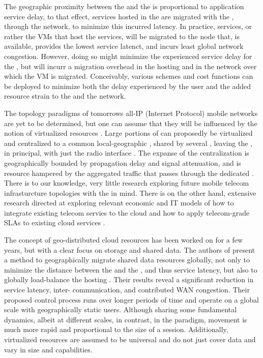 The geographic proximity between the \ue{} and the \dc{} is proportional to application service delay, to that effect, services hosted in the \xcloud{} are migrated with the \ue{}, through the network, to minimize this incurred latency. In practice, services, or rather the VMs that host the services, will be migrated to the node that, is available, provides the lowest service latenct, and incurs least global network congestion. However, doing so might minimize the experienced service delay for the \ue{}, but will incurr a migration overhead in the hosting \dc{} and in the network over which the VM is migrated. Conceivably, various schemes and cost functions can be deployed to minimize both the delay experienced by the user and the added resource strain to the \dc{} and the network.

The topology paradigms of tomorrows all-IP (Internet Protocol) mobile networks \cite{6144211,5357099} are yet to be determined, but one can assume that they will be influenced by the notion of virtualized resources \cite{baroncelli2010network, chowdhury2009network}. Large portions of \rbss{} can proposedly be virtualized and centralized to a common local-geographic \dc, shared by several \rbss{}, leaving the \rbss, in principal, with just the radio interface \cite{melzercloud}. The expanse of the centralization is geographically bounded by propagation delay and signal attenuation, and is resource hampered by the aggregated traffic that passes through the dedicated \dc. There is to our knowledge, very little research exploring future mobile telecom infrasturcture topologies with the \xcloud{} in mind. There is on the other hand, extensive research directed at exploring relevant economic and IT models of how to integrate existing telecom servies to the cloud and how to apply telecom-grade SLAs to existing cloud services \cite{EricssonWhitePaper,6156350, 5357099}.

The concept of geo-distributed cloud resources has been worked on for a few years, but with a clear focus on storage and shared data. The authors of \cite{agarwal2010volley} present a method to geographically migrate shared data resources globally, not only to minimize the distance between the \ue{} and the \dc{}, and thus service latency, but also to globally load-balance the hosting \dcs{}. Their results reveal a significant reduction in service latency, inter-\dc{} communication, and contributed WAN congestion. Their proposed control process runs over longer periods of time and operate on a global scale with geographically static users. Although sharing some fundamental dynamics, albeit at different scales, in contrast, in the \xcloud{} paradigm, \ue{} movement is much more rapid and proportional to the size of a session. Additionally, \xcloud{} virtualized resources are assumed to be universal and do not just cover data and vary in size and capabilities.

